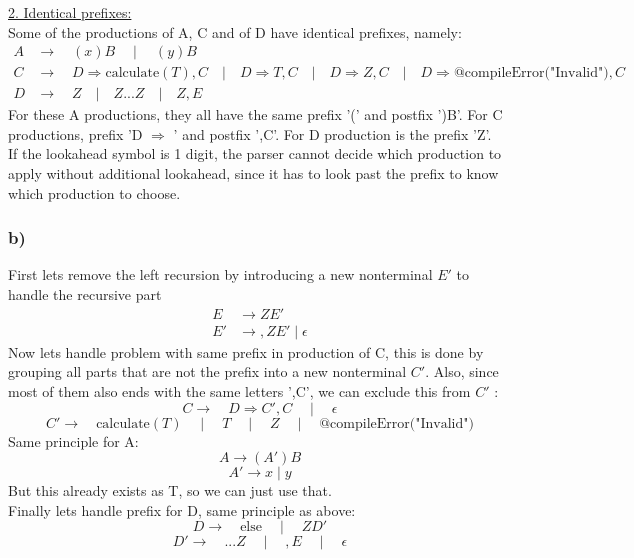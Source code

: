 \documentclass[10pt, a4paper]{article}
\begin{document}
\quad\quad\underline{2. Identical prefixes:}\\
    Some of the productions of A, C and of D have identical prefixes, namely:
     \[
     \begin{align*}
     A &\rightarrow  \quad (x) B \quad  \mid \quad  (y) B \\
     C &\rightarrow  \quad 
     D \Rightarrow \text{calculate}(T) , C \quad  |  \quad 
     D \Rightarrow T , C \quad  |  \quad 
     D \Rightarrow Z , C \quad  | \quad 
     D \Rightarrow @\text{compileError("Invalid")} , C \\
     D &\rightarrow  \quad 
     Z \quad  |  \quad 
     Z...Z \quad  |  \quad 
     Z,E
     \end{align*}
     \]
 For these A productions, they all have the same prefix '(' and postfix ')B'. For C productions, prefix 'D $\Rightarrow $ ' and postfix ',C'. For D production is the prefix 'Z'.\\ 
 If the lookahead symbol is 1 digit, the parser cannot decide which production to apply without additional lookahead, since it has to look past the prefix to know which production to choose.

\subsubsection{b)}
First lets remove the left recursion by introducing a new nonterminal \( E' \) to handle the recursive part
\begin{align*}
    E &\rightarrow Z E' \\
    E' &\rightarrow , Z E' \mid \epsilon
\end{align*}
Now lets handle problem with same prefix in production of C, this is done by grouping all parts that are not the prefix into a new nonterminal \( C' \). Also, since most of them also ends with the same letters ',C', we can exclude this from  \( C' \) :
    \[
    C \rightarrow \quad D \Rightarrow C' , C \quad \mid \quad \epsilon
    \]
    \[
    C' \rightarrow \quad \text{calculate}(T) \quad  \mid \quad  T \quad \mid \quad  Z \quad \mid \quad @\text{compileError("Invalid")}
    \]
Same principle for A: \\
    \[
    A \rightarrow ( A')B
    \]
        \[
    A' \rightarrow x \mid y
    \]
But this already exists as T, so we can just use that.\\
    
Finally lets handle prefix for D, same principle as above:
    \[
    D \rightarrow \quad \text{else} \quad  \mid  \quad Z D'
    \]
    \[
    D' \rightarrow \quad  ...Z \quad  \mid \quad  , E \quad \mid \quad  \epsilon
    \]
  
\end{document}

